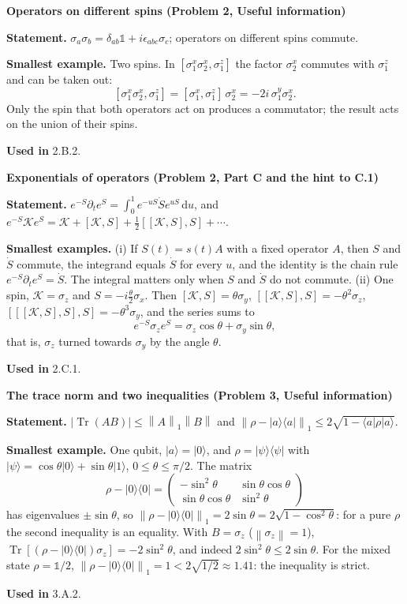 \documentclass[11pt,a4paper]{article}
\newcommand{\ket}[1]{\lvert #1\rangle}
\newcommand{\bra}[1]{\langle #1\rvert}
\newcommand{\Tr}{\operatorname{Tr}}
\newcommand{\dd}{\mathrm d}
\newcommand{\norm}[1]{\left\lVert #1\right\rVert}
\newcommand{\smallheading}[1]{\par\Needspace{6\baselineskip}\medskip\textbf{#1}\par}
\newcommand{\id}{\mathds 1}
\begin{document}
\smallheading{Operators on different spins (Problem 2, Useful information)}
\textbf{Statement.} $\sigma_a\sigma_b=\delta_{ab}\id+i\epsilon_{abc}\sigma_c$; operators on different spins commute.\par
\textbf{Smallest example.} Two spins. In $[\sigma_1^x\sigma_2^x,\sigma_1^z]$ the factor $\sigma_2^x$ commutes with $\sigma_1^z$ and can be taken out:
\[
[\sigma_1^x\sigma_2^x,\sigma_1^z]=[\sigma_1^x,\sigma_1^z]\,\sigma_2^x=-2i\,\sigma_1^y\sigma_2^x .
\]
Only the spin that both operators act on produces a commutator; the result acts on the union of their spins.\par
\textbf{Used in} 2.B.2.

\smallheading{Exponentials of operators (Problem 2, Part C and the hint to C.1)}
\textbf{Statement.} $e^{-S}\partial_te^S=\int_0^1e^{-uS}\dot Se^{uS}\,\dd u$, and $e^{-S}\mathcal Ke^{S}=\mathcal K+[\mathcal K,S]+\tfrac12[[\mathcal K,S],S]+\cdots$.\par
\textbf{Smallest examples.} (i) If $S(t)=s(t)A$ with a fixed operator $A$, then $S$ and $\dot S$ commute, the integrand equals $\dot S$ for every $u$, and the identity is the chain rule $e^{-S}\partial_te^S=\dot S$. The integral matters only when $S$ and $\dot S$ do not commute. (ii) One spin, $\mathcal K=\sigma_z$ and $S=-i\frac\theta2\sigma_x$. Then $[\mathcal K,S]=\theta\sigma_y$, $[[\mathcal K,S],S]=-\theta^2\sigma_z$, $[[[\mathcal K,S],S],S]=-\theta^3\sigma_y$, and the series sums to
\[
e^{-S}\sigma_ze^{S}=\sigma_z\cos\theta+\sigma_y\sin\theta ,
\]
that is, $\sigma_z$ turned towards $\sigma_y$ by the angle $\theta$.\par
\textbf{Used in} 2.C.1.

\smallheading{The trace norm and two inequalities (Problem 3, Useful information)}
\textbf{Statement.} $|\Tr(AB)|\leq\norm A_1\norm B$ and $\norm{\rho-\ket a\bra a}_1\leq2\sqrt{1-\bra a\rho\ket a}$.\par
\textbf{Smallest example.} One qubit, $\ket a=\ket0$, and $\rho=\ket\psi\bra\psi$ with $\ket\psi=\cos\theta\ket0+\sin\theta\ket1$, $0\leq\theta\leq\pi/2$. The matrix
\[
\rho-\ket0\bra0=\begin{pmatrix}-\sin^2\theta&\sin\theta\cos\theta\\\sin\theta\cos\theta&\sin^2\theta\end{pmatrix}
\]
has eigenvalues $\pm\sin\theta$, so $\norm{\rho-\ket0\bra0}_1=2\sin\theta=2\sqrt{1-\cos^2\theta}$: for a pure $\rho$ the second inequality is an equality. With $B=\sigma_z$ ($\norm{\sigma_z}=1$), $\Tr[(\rho-\ket0\bra0)\sigma_z]=-2\sin^2\theta$, and indeed $2\sin^2\theta\leq2\sin\theta$. For the mixed state $\rho=\id/2$, $\norm{\rho-\ket0\bra0}_1=1<2\sqrt{1/2}\approx1.41$: the inequality is strict.\par
\textbf{Used in} 3.A.2.
\end{document}
